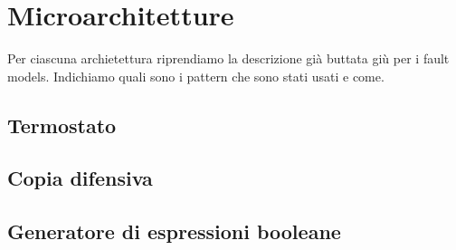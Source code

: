 \section{Microarchitetture}

Per ciascuna archietettura riprendiamo la descrizione già buttata giù per i fault models. 
Indichiamo quali sono i pattern che sono stati usati e come.

\subsection{Termostato}

\subsection{Copia difensiva}

\subsection{Generatore di espressioni booleane}